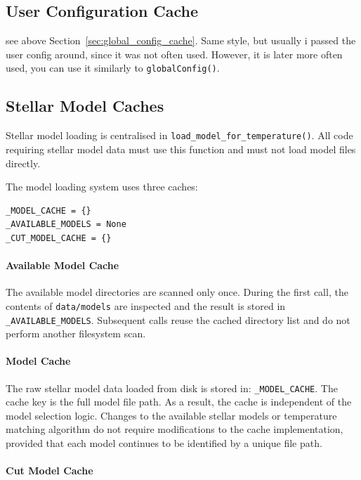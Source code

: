 \subsection{User Configuration Cache}
\label{sec:user_config_cache}
see above Section~\ref{sec:global_config_cache}. Same style, but usually i passed the user config around, since it was not often used. However, it is later more often used, you can use it similarly to \texttt{globalConfig()}.

\subsection{Stellar Model Caches}
\label{sec:stellar_model_cache}
Stellar model loading is centralised in \texttt{load\_model\_for\_temperature()}. All code requiring stellar model data must use this function and must not load model files directly.

The model loading system uses three caches:

\begin{verbatim}
_MODEL_CACHE = {}
_AVAILABLE_MODELS = None
_CUT_MODEL_CACHE = {}
\end{verbatim}

\paragraph{Available Model Cache}

The available model directories are scanned only once. During the first call, the contents of \texttt{data/models} are inspected and the result is stored in \texttt{\_AVAILABLE\_MODELS}. Subsequent calls reuse the cached directory list and do not perform another filesystem scan.

\paragraph{Model Cache}

The raw stellar model data loaded from disk is stored in: \texttt{\_MODEL\_CACHE}.
The cache key is the full model file path. As a result, the cache is independent of the model selection logic. Changes to the available stellar models or temperature matching algorithm do not require modifications to the cache implementation, provided that each model continues to be identified by a unique file path.

\paragraph{Cut Model Cache}

